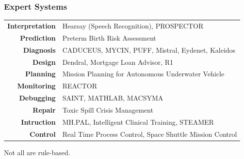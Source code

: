 \documentclass[xcolor={usenames,dvipsnames,svgnames}, compress]{beamer}
\begin{document}
\begin{frame}
  \frametitle{Expert Systems}
  \begin{table}[htbp]
    \centering
    \begin{tabular}{r l}
      \textbf{Interpretation} & Hearsay (Speech Recognition), PROSPECTOR\\
      \textbf{Prediction} & Preterm Birth Risk Assessment \\
      \textbf{Diagnosis} & CADUCEUS, MYCIN, PUFF, Mistral, Eydenet, Kaleidos\\
      \textbf{Design} & Dendral, Mortgage Loan Advisor, R1\\
      \textbf{Planning} & Mission Planning for Autonomous Underwater Vehicle\\
      \textbf{Monitoring} & REACTOR\\
      \textbf{Debugging} & SAINT, MATHLAB, MACSYMA\\
      \textbf{Repair} & Toxic Spill Crisis Management\\
      \textbf{Intruction} & MH.PAL, Intelligent Clinical Training, STEAMER\\
      \textbf{Control} & Real Time Process Control, Space Shuttle Mission Control\\
      
      
    \end{tabular}
  \end{table}
  
  Not all are rule-based.
\end{frame}

  
\end{document}
